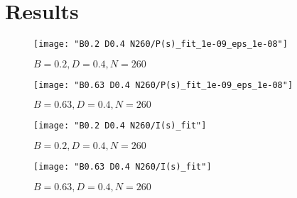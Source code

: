 \documentclass[../thesis.tex]{subfiles}
\begin{document}
\chapter{Results}

\begin{figure}
  \texttt{[image: "B0.2 D0.4 N260/P(s)\_fit\_1e-09\_eps\_1e-08"]}
  \caption{\(B=0.2, D=0.4, N=260\)}
\label{fig:P(s)-fit-b0.2n260}
\end{figure}

\begin{figure}
  \texttt{[image: "B0.63 D0.4 N260/P(s)\_fit\_1e-09\_eps\_1e-08"]}
  \caption{\(B=0.63, D=0.4, N=260\)}
\label{fig:P(s)-fit-b0.63n260}
\end{figure}

\begin{figure}
  \texttt{[image: "B0.2 D0.4 N260/I(s)\_fit"]}
  \caption{\(B=0.2, D=0.4, N=260\)}
\label{fig:I(s)-fit-b0.2n260}
\end{figure}

\begin{figure}
  \texttt{[image: "B0.63 D0.4 N260/I(s)\_fit"]}
  \caption{\(B=0.63, D=0.4, N=260\)}
\label{fig:I(s)-fit-b0.63n260}
\end{figure}
\end{document}

